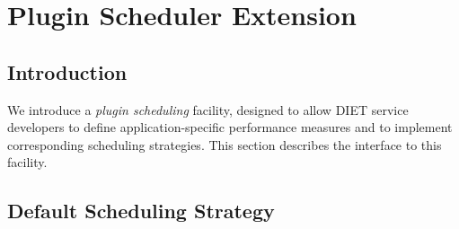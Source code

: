 

\newenvironment{code}
{\begin{list}{}{\setlength{\leftmargin}{1em}}\item\bfseries\tt}
{\end{list}}

\newenvironment{tinycode}
{\begin{list}{}{\setlength{\leftmargin}{1em}}\item\tiny\bfseries\tt}
{\end{list}}


\chapter{Plugin Scheduler Extension}
\label{ch:plugin}

\section{Introduction}

We introduce a
\emph{plugin scheduling} facility, designed to allow DIET service
developers to define application-specific performance measures and
to implement corresponding scheduling strategies.  This section
describes the interface to this facility.

\section{Default Scheduling Strategy}

